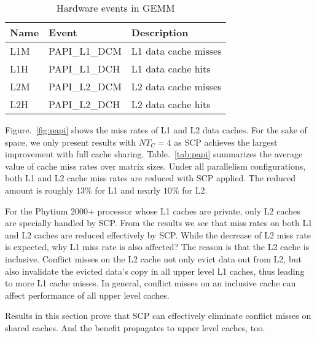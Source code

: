 \begin{table}
  \centering
  \caption{Hardware events in GEMM}
  \label{tab:events}
  \begin{tabular}{lll}
    \toprule
    Name & Event & Description \\
    \midrule
    L1M & PAPI\_L1\_DCM & L1 data cache misses \\
    L1H & PAPI\_L1\_DCH & L1 data cache hits \\
    L2M & PAPI\_L2\_DCM & L2 data cache misses \\
    L2H & PAPI\_L2\_DCH & L2 data cache hits \\
    \bottomrule
  \end{tabular}
\end{table}

Figure.~\ref{fig:papi} shows the miss rates of L1 and L2 data caches.
For the sake of space, we only present results with $NT_C=4$
as SCP achieves the largest improvement with full cache sharing.
Table.~\ref{tab:papi} summarizes the average value of cache miss rates
over matrix sizes.
Under all parallelism configurations,
both L1 and L2 cache miss rates are reduced with SCP applied.
The reduced amount is roughly $13\%$ for L1 and nearly $10\%$ for L2.

For the Phytium 2000+ processor whose L1 caches are private,
only L2 caches are specially handled by SCP.
From the results we see that miss rates on both L1 and L2 caches
are reduced effectively by SCP.
While the decrease of L2 miss rate is expected,
why L1 miss rate is also affected?
The reason is that the L2 cache is inclusive.
Conflict misses on the L2 cache not only evict data out from L2,
but also invalidate the evicted data's copy in all upper level L1 caches,
thus leading to more L1 cache misses.
In general, conflict misses on an inclusive cache can affect
performance of all upper level caches.

Results in this section prove that SCP can effectively
eliminate conflict misses on shared caches.
And the benefit propagates to upper level caches, too.

